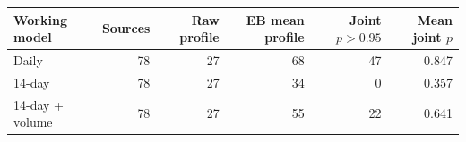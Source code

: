 \begin{tabular}{lrrrrr}
\toprule
Working model & Sources & Raw profile & EB mean profile & Joint $p>0.95$ & Mean joint $p$ \\
\midrule
Daily & 78 & 27 & 68 & 47 & 0.847 \\
14-day & 78 & 27 & 34 & 0 & 0.357 \\
14-day + volume & 78 & 27 & 55 & 22 & 0.641 \\
\bottomrule
\end{tabular}
